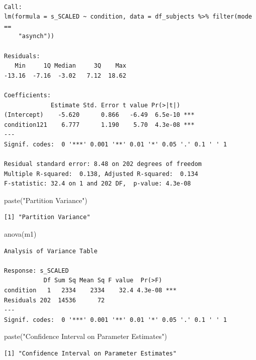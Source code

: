 \documentclass[
  letterpaper,
  DIV=11,
  numbers=noendperiod]{scrreprt}
\newenvironment{Shaded}{\begin{snugshade}}{\end{snugshade}}
\newcommand{\FunctionTok}[1]{\textcolor[rgb]{0.28,0.35,0.67}{#1}}
\newcommand{\NormalTok}[1]{\textcolor[rgb]{0.00,0.23,0.31}{#1}}
\newcommand{\StringTok}[1]{\textcolor[rgb]{0.13,0.47,0.30}{#1}}
\begin{document}
\begin{verbatim}

Call:
lm(formula = s_SCALED ~ condition, data = df_subjects %>% filter(mode == 
    "asynch"))

Residuals:
   Min     1Q Median     3Q    Max 
-13.16  -7.16  -3.02   7.12  18.62 

Coefficients:
             Estimate Std. Error t value Pr(>|t|)    
(Intercept)    -5.620      0.866   -6.49  6.5e-10 ***
condition121    6.777      1.190    5.70  4.3e-08 ***
---
Signif. codes:  0 '***' 0.001 '**' 0.01 '*' 0.05 '.' 0.1 ' ' 1

Residual standard error: 8.48 on 202 degrees of freedom
Multiple R-squared:  0.138, Adjusted R-squared:  0.134 
F-statistic: 32.4 on 1 and 202 DF,  p-value: 4.3e-08
\end{verbatim}

\begin{Shaded}
\begin{Highlighting}[]
\FunctionTok{paste}\NormalTok{(}\StringTok{"Partition Variance"}\NormalTok{)}
\end{Highlighting}
\end{Shaded}

\begin{verbatim}
[1] "Partition Variance"
\end{verbatim}

\begin{Shaded}
\begin{Highlighting}[]
\FunctionTok{anova}\NormalTok{(m1)}
\end{Highlighting}
\end{Shaded}

\begin{verbatim}
Analysis of Variance Table

Response: s_SCALED
           Df Sum Sq Mean Sq F value  Pr(>F)    
condition   1   2334    2334    32.4 4.3e-08 ***
Residuals 202  14536      72                    
---
Signif. codes:  0 '***' 0.001 '**' 0.01 '*' 0.05 '.' 0.1 ' ' 1
\end{verbatim}

\begin{Shaded}
\begin{Highlighting}[]
\FunctionTok{paste}\NormalTok{(}\StringTok{"Confidence Interval on Parameter Estimates"}\NormalTok{)}
\end{Highlighting}
\end{Shaded}

\begin{verbatim}
[1] "Confidence Interval on Parameter Estimates"
\end{verbatim}
\end{document}
